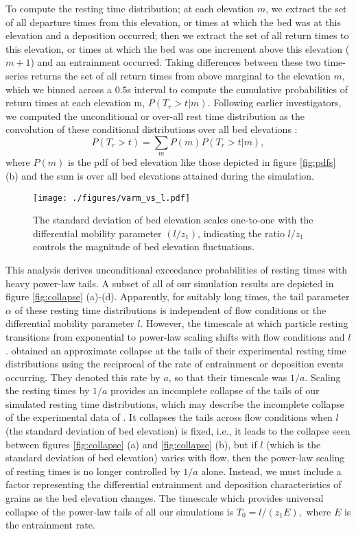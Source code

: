\documentclass[draft]{agujournal2018}
\newcommand\be{\begin{equation}} %
\newcommand\ee{\end{equation}}   %
\begin{document}
To compute the resting time distribution; at each elevation $m$, we extract the set of all departure times from this elevation, or times at which the bed was at this elevation and a deposition occurred; then we extract the set of all return times to this elevation, or times at which the bed was one increment above this elevation ($m+1$) and an entrainment occurred.
Taking differences between these two time-series returns the set of all return times from above marginal to the elevation $m$, which we binned across a $0.5$s interval to compute the cumulative probabilities of return times at each elevation m, $P(T_r>t|m)$.
Following earlier investigators, we computed the unconditional or over-all rest time distribution as the convolution of these conditional distributions over all bed elevations \citep[e.g.][]{Yang1972, Voepel2013}:
\be P(T_r>t) = \sum_m P(m) P(T_r > t| m), \ee
where $P(m)$ is the pdf of bed elevation like those depicted in figure \ref{fig:pdfs} (b) and the sum is over all bed elevations attained during the simulation. 

\begin{wrapfigure}{r}{0.5\textwidth}
\centering
\texttt{[image: ./figures/varm\_vs\_l.pdf]}
\caption{The standard deviation of bed elevation scales one-to-one with the differential mobility parameter $(l/z_1)$, indicating the ratio $l/z_1$ controls the magnitude of bed elevation fluctuations. }
\label{fig:var}
\end{wrapfigure}

This analysis derives unconditional exceedance probabilities of resting times with heavy power-law tails. 
A subset of all of our simulation results are depicted in figure \ref{fig:collapse} (a)-(d). 
Apparently, for suitably long times, the tail parameter $\alpha$ of these resting time distributions is independent of flow conditions or the differential mobility parameter $l$. 
However, the timescale at which particle resting transitions from exponential to power-law scaling shifts with flow conditions and $l$. 
\citet{Martin2014} obtained an approximate collapse at the tails of their experimental resting time distributions using the reciprocal of the rate of entrainment or deposition events occurring. They denoted this rate by $a$, so that their timescale was $1/a$.
Scaling the resting times by $1/a$ provides an incomplete collapse of the tails of our simulated resting time distributions, which may describe the incomplete collapse of the experimental data of \citet{Martin2014}.  
It collapses the tails across flow conditions when $l$ (the standard deviation of bed elevation) is fixed, i.e., it leads to the collapse seen between figures \ref{fig:collapse} (a) and \ref{fig:collapse} (b), but if $l$ (which is the standard deviation of bed elevation) varies with flow, then the power-law scaling of resting times is no longer controlled by $1/a$ alone. 
Instead, we must include a factor representing the differential entrainment and deposition characteristics of grains as the bed elevation changes. 
The timescale which provides universal collapse of the power-law tails of all our simulations is $T_0 = l/(z_1E),$ where $E$ is the entrainment rate.
\end{document}
